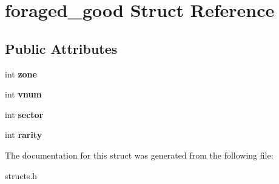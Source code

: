\hypertarget{structforaged__good}{\section{foraged\-\_\-good Struct Reference}
\label{structforaged__good}
}
\subsection*{Public Attributes}
\begin{DoxyCompactItemize}
\item 
\hypertarget{structforaged__good_a79e769df8c2d4b3c49e819bb92bdeb9d}{int {\bfseries zone}}\label{structforaged__good_a79e769df8c2d4b3c49e819bb92bdeb9d}

\item 
\hypertarget{structforaged__good_a5bbeb8524fc3c9374aa117184cb22a83}{int {\bfseries vnum}}\label{structforaged__good_a5bbeb8524fc3c9374aa117184cb22a83}

\item 
\hypertarget{structforaged__good_aba241a8d71a1882473ca9dbe08292501}{int {\bfseries sector}}\label{structforaged__good_aba241a8d71a1882473ca9dbe08292501}

\item 
\hypertarget{structforaged__good_a3e08c212f45ae6ff9c16282a9f197881}{int {\bfseries rarity}}\label{structforaged__good_a3e08c212f45ae6ff9c16282a9f197881}

\end{DoxyCompactItemize}


The documentation for this struct was generated from the following file\-:\begin{DoxyCompactItemize}
\item 
structs.\-h\end{DoxyCompactItemize}

